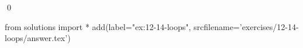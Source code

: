
\begin{ex}
  \label{ex:12-14-loops}
  
  \qed
\end{ex}
\begin{python0}
from solutions import *
add(label="ex:12-14-loops",
    srcfilename='exercises/12-14-loops/answer.tex')
\end{python0}
